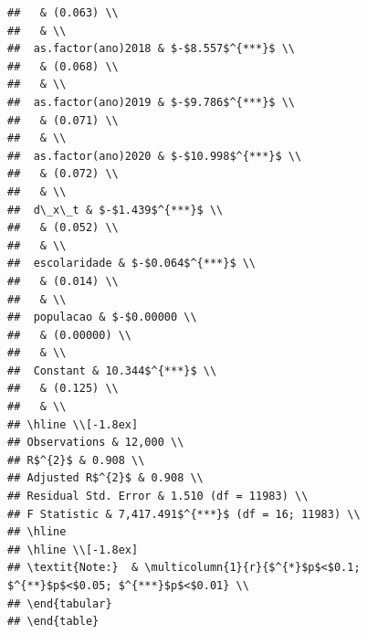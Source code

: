 \documentclass[
]{article}
\begin{document}
\begin{verbatim}
##   & (0.063) \\ 
##   & \\ 
##  as.factor(ano)2018 & $-$8.557$^{***}$ \\ 
##   & (0.068) \\ 
##   & \\ 
##  as.factor(ano)2019 & $-$9.786$^{***}$ \\ 
##   & (0.071) \\ 
##   & \\ 
##  as.factor(ano)2020 & $-$10.998$^{***}$ \\ 
##   & (0.072) \\ 
##   & \\ 
##  d\_x\_t & $-$1.439$^{***}$ \\ 
##   & (0.052) \\ 
##   & \\ 
##  escolaridade & $-$0.064$^{***}$ \\ 
##   & (0.014) \\ 
##   & \\ 
##  populacao & $-$0.00000 \\ 
##   & (0.00000) \\ 
##   & \\ 
##  Constant & 10.344$^{***}$ \\ 
##   & (0.125) \\ 
##   & \\ 
## \hline \\[-1.8ex] 
## Observations & 12,000 \\ 
## R$^{2}$ & 0.908 \\ 
## Adjusted R$^{2}$ & 0.908 \\ 
## Residual Std. Error & 1.510 (df = 11983) \\ 
## F Statistic & 7,417.491$^{***}$ (df = 16; 11983) \\ 
## \hline 
## \hline \\[-1.8ex] 
## \textit{Note:}  & \multicolumn{1}{r}{$^{*}$p$<$0.1; $^{**}$p$<$0.05; $^{***}$p$<$0.01} \\ 
## \end{tabular} 
## \end{table}
\end{verbatim}
\end{document}
